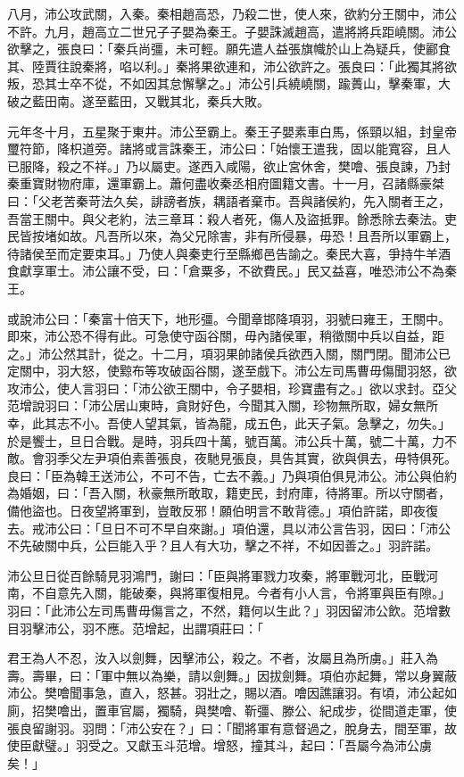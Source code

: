 \begin{pinyinscope}
八月，沛公攻武關，入秦。秦相趙高恐，乃殺二世，使人來，欲約分王關中，沛公不許。九月，趙高立二世兄子子嬰為秦王。子嬰誅滅趙高，遣將將兵距嶢關。沛公欲擊之，張良曰：「秦兵尚彊，未可輕。願先遣人益張旗幟於山上為疑兵，使酈食其、陸賈往說秦將，啗以利。」秦將果欲連和，沛公欲許之。張良曰：「此獨其將欲叛，恐其士卒不從，不如因其怠懈擊之。」沛公引兵繞嶢關，踰蕢山，擊秦軍，大破之藍田南。遂至藍田，又戰其北，秦兵大敗。

元年冬十月，五星聚于東井。沛公至霸上。秦王子嬰素車白馬，係頸以組，封皇帝璽符節，降枳道旁。諸將或言誅秦王，沛公曰：「始懷王遣我，固以能寬容，且人已服降，殺之不祥。」乃以屬吏。遂西入咸陽，欲止宮休舍，樊噲、張良諫，乃封秦重寶財物府庫，還軍霸上。蕭何盡收秦丞相府圖籍文書。十一月，召諸縣豪桀曰：「父老苦秦苛法久矣，誹謗者族，耦語者棄市。吾與諸侯約，先入關者王之，吾當王關中。與父老約，法三章耳：殺人者死，傷人及盜抵罪。餘悉除去秦法。吏民皆按堵如故。凡吾所以來，為父兄除害，非有所侵暴，毋恐！且吾所以軍霸上，待諸侯至而定要束耳。」乃使人與秦吏行至縣鄉邑告諭之。秦民大喜，爭持牛羊酒食獻享軍士。沛公讓不受，曰：「倉粟多，不欲費民。」民又益喜，唯恐沛公不為秦王。

或說沛公曰：「秦富十倍天下，地形彊。今聞章邯降項羽，羽號曰雍王，王關中。即來，沛公恐不得有此。可急使守函谷關，毋內諸侯軍，稍徵關中兵以自益，距之。」沛公然其計，從之。十二月，項羽果帥諸侯兵欲西入關，關門閉。聞沛公已定關中，羽大怒，使黥布等攻破函谷關，遂至戲下。沛公左司馬曹毋傷聞羽怒，欲攻沛公，使人言羽曰：「沛公欲王關中，令子嬰相，珍寶盡有之。」欲以求封。亞父范增說羽曰：「沛公居山東時，貪財好色，今聞其入關，珍物無所取，婦女無所幸，此其志不小。吾使人望其氣，皆為龍，成五色，此天子氣。急擊之，勿失。」於是饗士，旦日合戰。是時，羽兵四十萬，號百萬。沛公兵十萬，號二十萬，力不敵。會羽季父左尹項伯素善張良，夜馳見張良，具告其實，欲與俱去，毋特俱死。良曰：「臣為韓王送沛公，不可不告，亡去不義。」乃與項伯俱見沛公。沛公與伯約為婚姻，曰：「吾入關，秋豪無所敢取，籍吏民，封府庫，待將軍。所以守關者，備他盜也。日夜望將軍到，豈敢反邪！願伯明言不敢背德。」項伯許諾，即夜復去。戒沛公曰：「旦日不可不早自來謝。」項伯還，具以沛公言告羽，因曰：「沛公不先破關中兵，公巨能入乎？且人有大功，擊之不祥，不如因善之。」羽許諾。

沛公旦日從百餘騎見羽鴻門，謝曰：「臣與將軍戮力攻秦，將軍戰河北，臣戰河南，不自意先入關，能破秦，與將軍復相見。今者有小人言，令將軍與臣有隙。」羽曰：「此沛公左司馬曹毋傷言之，不然，籍何以生此？」羽因留沛公飲。范增數目羽擊沛公，羽不應。范增起，出謂項莊曰：「

君王為人不忍，汝入以劍舞，因擊沛公，殺之。不者，汝屬且為所虜。」莊入為壽。壽畢，曰：「軍中無以為樂，請以劍舞。」因拔劍舞。項伯亦起舞，常以身翼蔽沛公。樊噲聞事急，直入，怒甚。羽壯之，賜以酒。噲因譙讓羽。有頃，沛公起如廁，招樊噲出，置車官屬，獨騎，與樊噲、靳彊、滕公、紀成步，從間道走軍，使張良留謝羽。羽問：「沛公安在？」曰：「聞將軍有意督過之，脫身去，間至軍，故使臣獻璧。」羽受之。又獻玉斗范增。增怒，撞其斗，起曰：「吾屬今為沛公虜矣！」


\end{pinyinscope}
